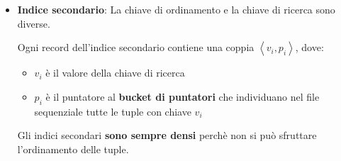 \documentclass[a4paper]{article}
\begin{document}
\begin{itemize}
\begin{itemize}
\begin{itemize}
\begin{itemize}
              \item Se l'indice è \textbf{sparso} l'inserimento avviene solo quando,
                per effetto dell'inserimento di una nuova tupla, si aggiunge un blocco
                dati alla struttura; in tutti gli altri casi l'indice rimane invariato
            \end{itemize}
            Gli indici sono costosi, quindi bisogna fare un compromesso sul numero di indici
            da mantenere e il numero di attributi ad accesso sequenziale.

          \item \textbf{Cancellazione} di un record nell'indice. Si effettuano gli stessi
            passi della cancellazione in un file sequenziale
            (\ref{item:cancellazione_ordinata}).

            \begin{itemize}
              \item Se l'indice è \textbf{denso} la cancellazione nell'indice avviene
                solo se la tupla cancellata nel file è l’ultima tupla con valore di
                chiave \( K \)  

              \item Se l'indice è \textbf{sparso} la cancellazione nell'indice avviene
                solo quando \( K \) è presente nell'indice e il corrispondente blocco
                viene eliminato; altrimenti, se il blocco sopravvive, va sostituito
                \( K \) nel record dell'indice con il primo valore \( K' \) presente
                nel blocco.
            \end{itemize}
        \end{itemize}
    \end{itemize}

  \item \textbf{Indice secondario}: La chiave di ordinamento e la chiave di ricerca
    sono diverse.

    Ogni record dell'indice secondario contiene una coppia \( \left<v_i, p_i \right> \),
    dove:
    \begin{itemize}
      \item \( v_i \) è il valore della chiave di ricerca
      \item \( p_i \) è il puntatore al \textbf{bucket di puntatori} che individuano
        nel file sequenziale tutte le tuple con chiave \( v_i \)
    \end{itemize}
    Gli indici secondari \textbf{sono sempre densi} perchè non si può sfruttare
    l'ordinamento delle tuple.


\end{itemize}
\end{document}
